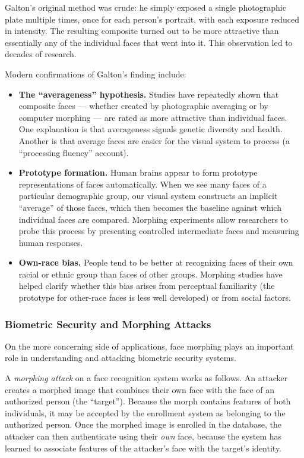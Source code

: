 Galton's original method was crude: he simply exposed a single photographic plate multiple times,
once for each person's portrait, with each exposure reduced in intensity. The resulting composite
turned out to be more attractive than essentially any of the individual faces that went into it.
This observation led to decades of research.

Modern confirmations of Galton's finding include:

\begin{itemize}
    \item \textbf{The ``averageness'' hypothesis.} Studies have repeatedly shown that composite
    faces --- whether created by photographic averaging or by computer morphing --- are rated as
    more attractive than individual faces. One explanation is that averageness signals genetic
    diversity and health. Another is that average faces are easier for the visual system to
    process (a ``processing fluency'' account).

    \item \textbf{Prototype formation.} Human brains appear to form prototype representations of
    faces automatically. When we see many faces of a particular demographic group, our visual
    system constructs an implicit ``average'' of those faces, which then becomes the baseline
    against which individual faces are compared. Morphing experiments allow researchers to probe
    this process by presenting controlled intermediate faces and measuring human responses.

    \item \textbf{Own-race bias.} People tend to be better at recognizing faces of their own racial
    or ethnic group than faces of other groups. Morphing studies have helped clarify whether this
    bias arises from perceptual familiarity (the prototype for other-race faces is less well
    developed) or from social factors.
\end{itemize}


\subsubsection{Biometric Security and Morphing Attacks}

On the more concerning side of applications, face morphing plays an important role in understanding
and attacking biometric security systems.

A \emph{morphing attack} on a face recognition system works as follows. An attacker creates a
morphed image that combines their own face with the face of an authorized person (the ``target'').
Because the morph contains features of both individuals, it may be accepted by the enrollment
system as belonging to the authorized person. Once the morphed image is enrolled in the database,
the attacker can then authenticate using their \emph{own} face, because the system has learned to
associate features of the attacker's face with the target's identity.

